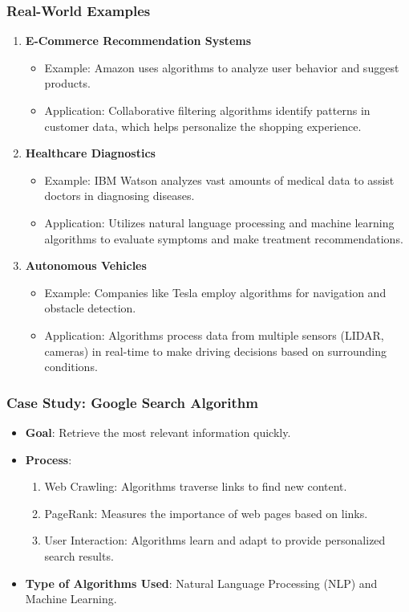 \documentclass{beamer}
\begin{document}
\begin{frame}[fragile]
    \frametitle{Real-World Examples}
    \begin{enumerate}
        \item \textbf{E-Commerce Recommendation Systems}
        \begin{itemize}
            \item Example: Amazon uses algorithms to analyze user behavior and suggest products.
            \item Application: Collaborative filtering algorithms identify patterns in customer data, which helps personalize the shopping experience.
        \end{itemize}

        \item \textbf{Healthcare Diagnostics}
        \begin{itemize}
            \item Example: IBM Watson analyzes vast amounts of medical data to assist doctors in diagnosing diseases.
            \item Application: Utilizes natural language processing and machine learning algorithms to evaluate symptoms and make treatment recommendations.
        \end{itemize}

        \item \textbf{Autonomous Vehicles}
        \begin{itemize}
            \item Example: Companies like Tesla employ algorithms for navigation and obstacle detection.
            \item Application: Algorithms process data from multiple sensors (LIDAR, cameras) in real-time to make driving decisions based on surrounding conditions.
        \end{itemize}
    \end{enumerate}
\end{frame}

\begin{frame}[fragile]
    \frametitle{Case Study: Google Search Algorithm}
    \begin{itemize}
        \item \textbf{Goal}: Retrieve the most relevant information quickly.
        \item \textbf{Process}:
        \begin{enumerate}
            \item Web Crawling: Algorithms traverse links to find new content.
            \item PageRank: Measures the importance of web pages based on links.
            \item User Interaction: Algorithms learn and adapt to provide personalized search results.
        \end{enumerate}
        \item \textbf{Type of Algorithms Used}: 
        Natural Language Processing (NLP) and Machine Learning.
    \end{itemize}
\end{frame}
\end{document}
